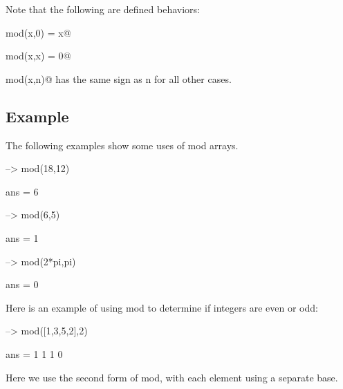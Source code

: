 Note that the following are defined behaviors\-: 
\begin{DoxyEnumerate}
\item {\ttfamily mod(x,0) = x}@  
\item {\ttfamily mod(x,x) = 0}@  
\item {\ttfamily mod(x,n)}@ has the same sign as {\ttfamily n} for all other cases.  
\end{DoxyEnumerate}\hypertarget{variables_struct_Example}{}\subsection{Example}\label{variables_struct_Example}
The following examples show some uses of {\ttfamily mod} arrays.


\begin{DoxyVerbInclude}
--> mod(18,12)

ans = 
 6 

--> mod(6,5)

ans = 
 1 

--> mod(2*pi,pi)

ans = 
 0 
\end{DoxyVerbInclude}


Here is an example of using {\ttfamily mod} to determine if integers are even or odd\-:


\begin{DoxyVerbInclude}
--> mod([1,3,5,2],2)

ans = 
 1 1 1 0 
\end{DoxyVerbInclude}


Here we use the second form of {\ttfamily mod}, with each element using a separate base.


